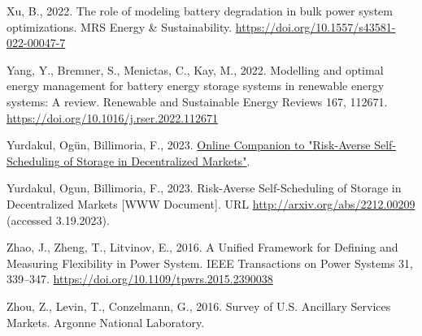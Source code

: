 \documentclass[12pt,a4paper,]{report}
\newlength{\cslhangindent}
\newenvironment{CSLReferences}[2] %
 {%
  \setlength{\parindent}{0pt}
  \ifodd #1 \everypar{\setlength{\hangindent}{\cslhangindent}}\ignorespaces\fi
  \ifnum #2 > 0
  \setlength{\parskip}{#2\baselineskip}
  \fi
 }%
 {}
\begin{document}
\begin{CSLReferences}{1}{0}
\leavevmode{}%
Xu, B., 2022. The role of modeling battery degradation in bulk power
system optimizations. MRS Energy \& Sustainability.
\url{https://doi.org/10.1557/s43581-022-00047-7}

\leavevmode{}%
Yang, Y., Bremner, S., Menictas, C., Kay, M., 2022. Modelling and
optimal energy management for battery energy storage systems in
renewable energy systems: {A} review. Renewable and Sustainable Energy
Reviews 167, 112671. \url{https://doi.org/10.1016/j.rser.2022.112671}

\leavevmode{}%
Yurdakul, Ogün, Billimoria, F., 2023.
\href{https://github.com/oyurdakul/pesgm23}{Online {Companion} to
"{Risk-Averse Self-Scheduling} of {Storage} in {Decentralized
Markets}"}.

\leavevmode{}%
Yurdakul, Ogun, Billimoria, F., 2023. Risk-{Averse Self-Scheduling} of
{Storage} in {Decentralized Markets} {[}WWW Document{]}. URL
\url{http://arxiv.org/abs/2212.00209} (accessed 3.19.2023).

\leavevmode{}%
Zhao, J., Zheng, T., Litvinov, E., 2016. A {Unified Framework} for
{Defining} and {Measuring Flexibility} in {Power System}. IEEE
Transactions on Power Systems 31, 339--347.
\url{https://doi.org/10.1109/tpwrs.2015.2390038}

\leavevmode{}%
Zhou, Z., Levin, T., Conzelmann, G., 2016. Survey of {U}.{S}. {Ancillary
Services Markets}. {Argonne National Laboratory}.

\end{CSLReferences}
\end{document}
